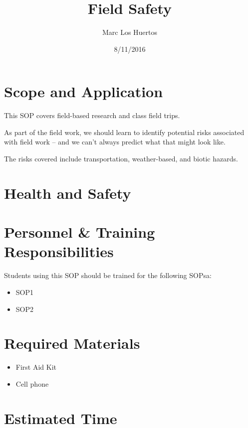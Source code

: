 \documentclass[12pt]{../SOP2}
\title{Field Safety}
\date{8/11/2016}
\author{Marc Los Huertos}
\begin{document}


\maketitle

\section{Scope and Application}

\NP This SOP covers field-based research and class field trips. 

\NP As part of the field work, we should learn to identify potential risks associated with field work -- and we can't always predict what that might look like.

\NP The risks covered include transportation, weather-based, and biotic hazards.

\section{Health and Safety}

\NP \lipsum[2]


\section{Personnel \& Training Responsibilities}

\NP \lipsum[1]

Students using this SOP should be trained for the following SOPsa:

\begin{itemize}
  \item SOP1
  \item SOP2
\end{itemize}


\section{Required Materials}

\begin{itemize}
  \item First Aid Kit
  \item Cell phone
\end{itemize}

\section{Estimated Time}
\end{document}
